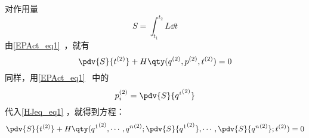 
对作用量
\begin{equation}
S=\int_{t_1}^{t_2}L\dd t
\end{equation}
由\autoref{EPAct_eq1}~，就有
\begin{equation}\label{HJeq_eq1}
\pdv{S}{t^{(2)}}+H\qty(q^{(2)},p^{(2)},t^{(2)})=0
\end{equation}
同样，用\autoref{EPAct_eq1}~ 中的
\begin{equation}
p_i^{(2)}=\pdv{S}{{q^i}^{(2)}}
\end{equation}
代入\autoref{HJeq_eq1} ，就得到方程：
\begin{equation}
\pdv{S}{t^{(2)}}+H\qty({q^1}^{(2)},\cdots,{q^n}^{(2)};\pdv{S}{{q^1}^{(2)}},\cdots,\pdv{S}{{q^n}^{(2)}};t^{(2)})=0
\end{equation}
